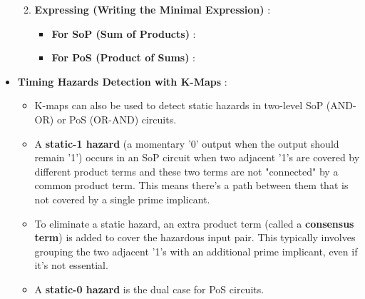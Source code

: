 \documentclass{article}
\begin{document}
\begin{itemize}
\begin{enumerate}
\begin{itemize}
        \end{itemize}
        \item \textbf{Expressing (Writing the Minimal Expression)} :
        \begin{itemize}
            \item \textbf{For SoP (Sum of Products)} :
            \item \textbf{For PoS (Product of Sums)} :
        \end{itemize}
    \end{enumerate}
    \item \textbf{Timing Hazards Detection with K-Maps} :
    \begin{itemize}
        \item K-maps can also be used to detect static hazards in two-level SoP (AND-OR) or PoS (OR-AND) circuits.
        \item A \textbf{static-1 hazard} (a momentary '0' output when the output should remain '1') occurs in an SoP circuit when two adjacent '1's are covered by different product terms and these two terms are not "connected" by a common product term. This means there's a path between them that is not covered by a single prime implicant.
        \item To eliminate a static hazard, an extra product term (called a \textbf{consensus term}) is added to cover the hazardous input pair. This typically involves grouping the two adjacent '1's with an additional prime implicant, even if it's not essential.
        \item A \textbf{static-0 hazard} is the dual case for PoS circuits.
    \end{itemize}
\end{itemize}
\end{document}
